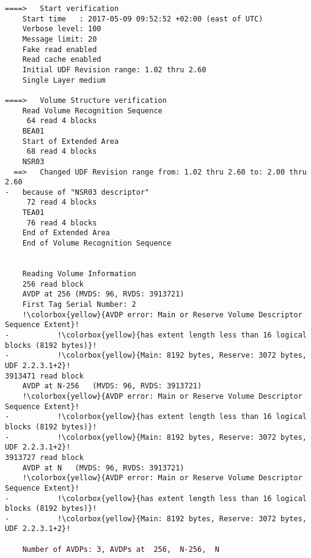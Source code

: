 \begin{lstlisting}
====>   Start verification
    Start time   : 2017-05-09 09:52:52 +02:00 (east of UTC)
    Verbose level: 100
    Message limit: 20
    Fake read enabled
    Read cache enabled
    Initial UDF Revision range: 1.02 thru 2.60
    Single Layer medium

====>   Volume Structure verification
    Read Volume Recognition Sequence
     64 read 4 blocks
    BEA01
    Start of Extended Area
     68 read 4 blocks
    NSR03
  ==>   Changed UDF Revision range from: 1.02 thru 2.60 to: 2.00 thru 2.60
-   because of "NSR03 descriptor"
     72 read 4 blocks
    TEA01
     76 read 4 blocks
    End of Extended Area
    End of Volume Recognition Sequence


    Reading Volume Information
    256 read block
    AVDP at 256 (MVDS: 96, RVDS: 3913721)
    First Tag Serial Number: 2
    !\colorbox{yellow}{AVDP error: Main or Reserve Volume Descriptor Sequence Extent}!
-           !\colorbox{yellow}{has extent length less than 16 logical blocks (8192 bytes)}!
-           !\colorbox{yellow}{Main: 8192 bytes, Reserve: 3072 bytes, UDF 2.2.3.1+2}!
3913471 read block
    AVDP at N-256   (MVDS: 96, RVDS: 3913721)
    !\colorbox{yellow}{AVDP error: Main or Reserve Volume Descriptor Sequence Extent}!
-           !\colorbox{yellow}{has extent length less than 16 logical blocks (8192 bytes)}!
-           !\colorbox{yellow}{Main: 8192 bytes, Reserve: 3072 bytes, UDF 2.2.3.1+2}!
3913727 read block
    AVDP at N   (MVDS: 96, RVDS: 3913721)
    !\colorbox{yellow}{AVDP error: Main or Reserve Volume Descriptor Sequence Extent}!
-           !\colorbox{yellow}{has extent length less than 16 logical blocks (8192 bytes)}!
-           !\colorbox{yellow}{Main: 8192 bytes, Reserve: 3072 bytes, UDF 2.2.3.1+2}!

    Number of AVDPs: 3, AVDPs at  256,  N-256,  N


\end{lstlisting}
